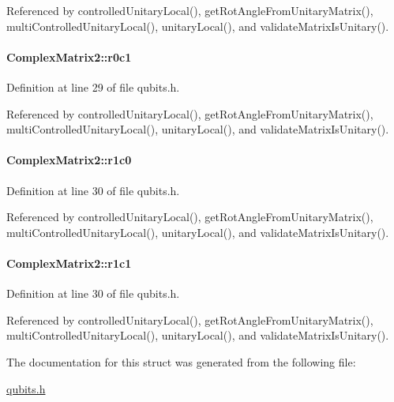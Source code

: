 Referenced by controlledUnitaryLocal(), getRotAngleFromUnitaryMatrix(), multiControlledUnitaryLocal(), unitaryLocal(), and validateMatrixIsUnitary().\hypertarget{structComplexMatrix2_a0f3932f055a8b05cef361bce25d51172}{
\paragraph[{r0c1}]{ {\bf ComplexMatrix2::r0c1}}\hfill}
\label{structComplexMatrix2_a0f3932f055a8b05cef361bce25d51172}


Definition at line 29 of file qubits.h.

Referenced by controlledUnitaryLocal(), getRotAngleFromUnitaryMatrix(), multiControlledUnitaryLocal(), unitaryLocal(), and validateMatrixIsUnitary().\hypertarget{structComplexMatrix2_ab98282015ed2065e53fbc9638e2583ab}{
\paragraph[{r1c0}]{ {\bf ComplexMatrix2::r1c0}}\hfill}
\label{structComplexMatrix2_ab98282015ed2065e53fbc9638e2583ab}


Definition at line 30 of file qubits.h.

Referenced by controlledUnitaryLocal(), getRotAngleFromUnitaryMatrix(), multiControlledUnitaryLocal(), unitaryLocal(), and validateMatrixIsUnitary().\hypertarget{structComplexMatrix2_a763007c3070802373549ba0350f83c8a}{
\paragraph[{r1c1}]{ {\bf ComplexMatrix2::r1c1}}\hfill}
\label{structComplexMatrix2_a763007c3070802373549ba0350f83c8a}


Definition at line 30 of file qubits.h.

Referenced by controlledUnitaryLocal(), getRotAngleFromUnitaryMatrix(), multiControlledUnitaryLocal(), unitaryLocal(), and validateMatrixIsUnitary().

The documentation for this struct was generated from the following file:\begin{DoxyCompactItemize}
\item 
\hyperlink{qubits_8h}{qubits.h}\end{DoxyCompactItemize}
